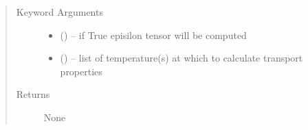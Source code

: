 \documentclass[letterpaper,10pt,english]{sphinxmanual}
\begin{document}
\begin{fulllineitems}
\begin{fulllineitems}
\begin{quote}
\begin{description}
\item[{Keyword Arguments}] \leavevmode\begin{itemize}
\item {} 
 () -- if True episilon tensor will be computed

\item {} 
 () -- list of temperature(s) at which to calculate transport properties

\end{itemize}

\item[{Returns}] \leavevmode
None

\end{description}\end{quote}

\end{fulllineitems}


\end{fulllineitems}

\end{document}
